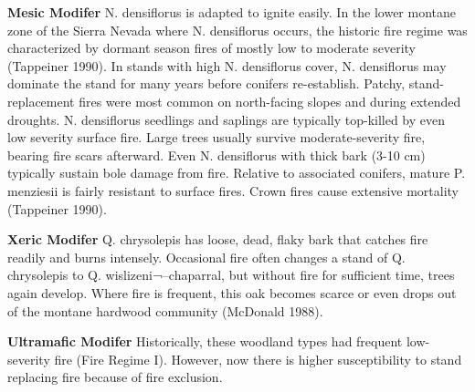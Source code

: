 \begin{adjustwidth}{2cm}{}
\textbf{Mesic Modifer }
N. densiflorus is adapted to ignite easily. In the lower montane zone of the Sierra Nevada where N. densiflorus occurs, the historic fire regime was characterized by dormant season fires of mostly low to moderate severity (Tappeiner 1990). In stands with high N. densiflorus cover, N. densiflorus may dominate the stand for many years before conifers re-establish. Patchy, stand-replacement fires were most common on north-facing slopes and during extended droughts. N. densiflorus seedlings and saplings are typically top-killed by even low severity surface fire. Large trees usually survive moderate-severity fire, bearing fire scars afterward. Even N. densiflorus with thick bark (3-10 cm) typically sustain bole damage from fire. Relative to associated conifers, mature P. menziesii is fairly resistant to surface fires. Crown fires cause extensive mortality (Tappeiner 1990).

\medskip
\noindent \textbf{Xeric Modifer} Q. chrysolepis has loose, dead, flaky bark that catches fire readily and burns intensely. Occasional fire often changes a stand of Q. chrysolepis to Q. wislizeni¬–chaparral, but without fire for sufficient time, trees again develop. Where fire is frequent, this oak becomes scarce or even drops out of the montane hardwood community (McDonald 1988).

\medskip
\noindent \textbf{Ultramafic Modifer} Historically, these woodland types had frequent low-severity fire (Fire Regime I). However, now there is higher susceptibility to stand replacing fire because of fire exclusion.

\end{adjustwidth}



